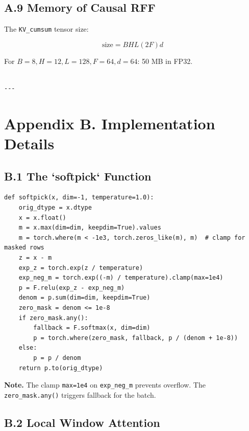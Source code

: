 \subsection{A.9 Memory of Causal RFF}

The \texttt{KV\_cumsum} tensor size:

\[
\text{size} = B H L (2F) d
\tag{A.13}
\]

For $B=8, H=12, L=128, F=64, d=64$: 50 MB in FP32.
\begin{lstlisting}

---
\end{lstlisting}


\section{Appendix B. Implementation Details}

\subsection{B.1 The `softpick` Function}

\begin{lstlisting}
def softpick(x, dim=-1, temperature=1.0):
    orig_dtype = x.dtype
    x = x.float()
    m = x.max(dim=dim, keepdim=True).values
    m = torch.where(m < -1e3, torch.zeros_like(m), m)  # clamp for masked rows
    z = x - m
    exp_z = torch.exp(z / temperature)
    exp_neg_m = torch.exp((-m) / temperature).clamp(max=1e4)
    p = F.relu(exp_z - exp_neg_m)
    denom = p.sum(dim=dim, keepdim=True)
    zero_mask = denom <= 1e-8
    if zero_mask.any():
        fallback = F.softmax(x, dim=dim)
        p = torch.where(zero_mask, fallback, p / (denom + 1e-8))
    else:
        p = p / denom
    return p.to(orig_dtype)
\end{lstlisting}

\textbf{Note.} The clamp \texttt{max=1e4} on \texttt{exp\_neg\_m} prevents overflow. The 
\texttt{zero\_mask.any()} triggers fallback for the batch.

\subsection{B.2 Local Window Attention}

